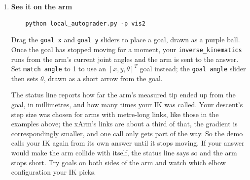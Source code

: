 \documentclass{16384_doc}
\begin{document}
\begin{questions}
\begin{enumerate} [label=\alph*.]
        Note that for examples 2 and 3, the resulting joint angles are different
        because of the inclusion of the end effector orientation constraint.

        A caution here is that numerical methods for IK are \emph{local}. For
        example, the first problem above has two solutions (elbow up/elbow down),
        but numerical IK only finds the one closest to the initial configuration
        (or in the case of constraints such as joint angles, may not find any
        valid solution). This is important to consider for real-world
        applications.

        This local approach can be a benefit over analytical methods, though: for
        example, in the first problem, if the goal was $[-2, 2]^T$, analytical IK
        would return no solution, whereas numerical methods would still minimize
        the cost as best as possible and result in a ``close'' solution.

        Another note: you can make the optimization more accurate by decreasing
        the step size and stopping condition; however, for our `plain' gradient
        descent implementation, this can result in long runtimes. There are
        built-in numerical optimization methods in Python (e.g., from
        \verb!scipy.optimize!) that are much more efficient than our simple
        approach here, resulting in more accurate results in less time.

        \item \textbf{See it on the arm}

\begin{verbatim}
    python local_autograder.py -p vis2
\end{verbatim}

        Drag the \verb!goal x! and \verb!goal y! sliders to place a goal, drawn
        as a purple ball. Once the goal has stopped moving for a moment, your
        \verb!inverse_kinematics! runs from the arm's current joint angles and the
        arm is sent to the answer. Set \verb!match angle! to 1 to use an
        $[x, y, \theta]^T$ goal instead; the \verb!goal angle! slider then sets
        $\theta$, drawn as a short arrow from the goal.

        The status line reports how far the arm's measured tip ended up from the
        goal, in millimetres, and how many times your IK was called. Your
        descent's step size was chosen for arms with metre-long links, like
        those in the examples above; the xArm's links are about a third of that,
        the gradient is correspondingly smaller, and one call only gets part of
        the way. So the demo calls your IK again from its own answer until it
        stops moving. If your answer would make the arm collide with itself, the
        status line says so and the arm stops short. Try goals on both sides of
        the arm and watch which elbow configuration your IK picks.


\end{enumerate}
\end{questions}
\end{document}
